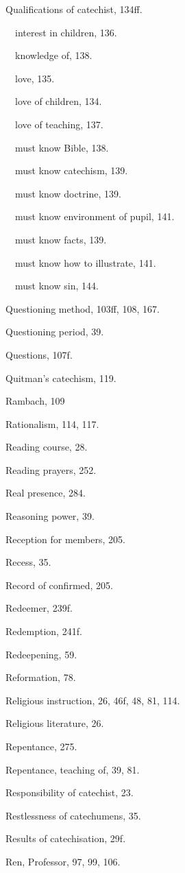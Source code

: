 \begin{originalinhalt}

Qualifications of catechist, 134ff.

 interest in children, 136.

 knowledge of, 138.

 love, 135.

 love of children, 134.

 love of teaching, 137.

 must know Bible, 138.

 must know catechism, 139.

 must know doctrine, 139.

 must know environment of pupil, 141.

 must know facts, 139.

 must know how to illustrate, 141.

 must know sin, 144.

Questioning method, 103ff, 108, 167.

Questioning period, 39.

Questions, 107f.

Quitman’s catechism, 119.


Rambach, 109

Rationalism, 114, 117.

Reading course, 28.

Reading prayers, 252.

Real presence, 284.

Reasoning power, 39.

Reception for members, 205.

Recess, 35.

Record of confirmed, 205.

Redeemer, 239f.

Redemption, 241f.

Redeepening, 59.

Reformation, 78.

Religious instruction, 26, 46f, 48, 81, 114.

Religious literature, 26.

Repentance, 275.

Repentance, teaching of, 39, 81.

Responsibility of catechist, 23.

Restlessness of catechumens, 35.

Results of catechisation, 29f.

Ren, Professor, 97, 99, 106.


\end{originalinhalt}
